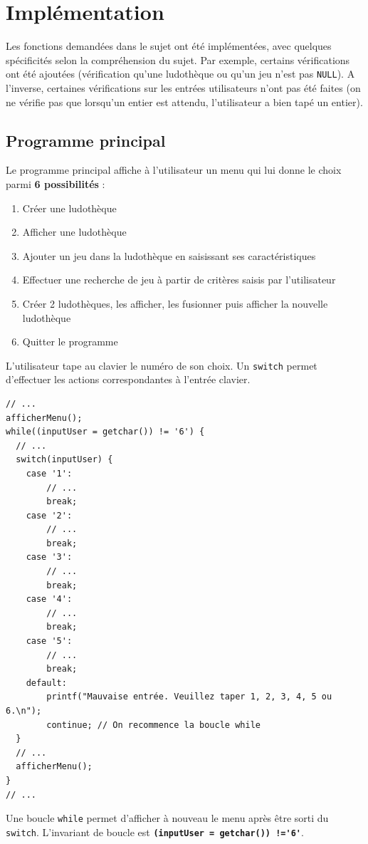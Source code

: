 \chapter{Implémentation}
Les fonctions demandées dans le sujet ont été implémentées, avec quelques spécificités selon la compréhension du sujet. Par exemple, certains vérifications ont été ajoutées (vérification qu'une ludothèque ou qu'un jeu n'est pas \lstinline{NULL}). A l'inverse, certaines vérifications sur les entrées utilisateurs n'ont pas été faites (on ne vérifie pas que lorsqu'un entier est attendu, l'utilisateur a bien tapé un entier).

\section{Programme principal}
Le programme principal affiche à l'utilisateur un menu qui lui donne le choix parmi \textbf{6 possibilités} :
\begin{enumerate}
  \item Créer une ludothèque
  \item Afficher une ludothèque
  \item Ajouter un jeu dans la ludothèque en saisissant ses caractéristiques
  \item Effectuer une recherche de jeu à partir de critères saisis par l’utilisateur
  \item Créer 2 ludothèques, les afficher, les fusionner puis afficher la nouvelle ludothèque
  \item Quitter le programme
\end{enumerate}
L'utilisateur tape au clavier le numéro de son choix. Un \lstinline{switch} permet d'effectuer les actions correspondantes à l'entrée clavier.
\begin{lstlisting}
// ...
afficherMenu();
while((inputUser = getchar()) != '6') {
  // ...
  switch(inputUser) {
    case '1':
        // ...
        break;
    case '2':
        // ...
        break;
    case '3':
        // ...
        break;
    case '4':
        // ...
        break;
    case '5':
        // ...
        break;
    default:
        printf("Mauvaise entrée. Veuillez taper 1, 2, 3, 4, 5 ou 6.\n");
        continue; // On recommence la boucle while
  }
  // ...
  afficherMenu();
}
// ...
\end{lstlisting}
Une boucle \lstinline{while} permet d'afficher à nouveau le menu après être sorti du \lstinline{switch}. L'invariant de boucle est \textbf{\lstinline{(inputUser = getchar()) !='6'}}.

